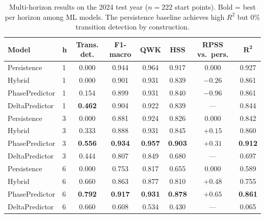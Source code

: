 \documentclass[11pt,letterpaper]{article}
\begin{document}
\begin{table}[H]
\centering
\small
\caption{Multi-horizon results on the 2024 test year ($n = 222$ start points). Bold = best per horizon among ML models. The persistence baseline achieves high $R^2$ but 0\% transition detection by construction.}
\label{tab:multi-horizon}
\begin{tabular}{llcccccc}
\toprule
\textbf{Model} & \textbf{h} & \textbf{Trans. det.} & \textbf{F1-macro} & \textbf{QWK} & \textbf{HSS} & \textbf{RPSS vs.\ pers.} & $\mathbf{R^2}$ \\
\midrule
Persistence     & 1 & 0.000 & 0.944 & 0.964 & 0.917 & 0.000 & 0.927 \\
Hybrid          & 1 & 0.000 & 0.901 & 0.931 & 0.839 & $-0.26$ & 0.861 \\
PhasePredictor  & 1 & 0.154 & 0.899 & 0.931 & 0.840 & $-0.96$ & 0.861 \\
DeltaPredictor  & 1 & \textbf{0.462} & 0.904 & 0.922 & 0.839 & --- & 0.844 \\
\midrule
Persistence     & 3 & 0.000 & 0.881 & 0.924 & 0.826 & 0.000 & 0.842 \\
Hybrid          & 3 & 0.333 & 0.888 & 0.931 & 0.845 & $+0.15$ & 0.860 \\
PhasePredictor  & 3 & \textbf{0.556} & \textbf{0.934} & \textbf{0.957} & \textbf{0.903} & \textbf{$+0.31$} & \textbf{0.912} \\
DeltaPredictor  & 3 & 0.444 & 0.807 & 0.849 & 0.680 & --- & 0.697 \\
\midrule
Persistence     & 6 & 0.000 & 0.753 & 0.817 & 0.655 & 0.000 & 0.589 \\
Hybrid          & 6 & 0.660 & 0.863 & 0.877 & 0.810 & $+0.48$ & 0.755 \\
PhasePredictor  & 6 & \textbf{0.792} & \textbf{0.917} & \textbf{0.931} & \textbf{0.878} & \textbf{$+0.65$} & \textbf{0.861} \\
DeltaPredictor  & 6 & 0.660 & 0.608 & 0.534 & 0.430 & --- & 0.065 \\
\bottomrule
\end{tabular}
\end{table}
\end{document}
